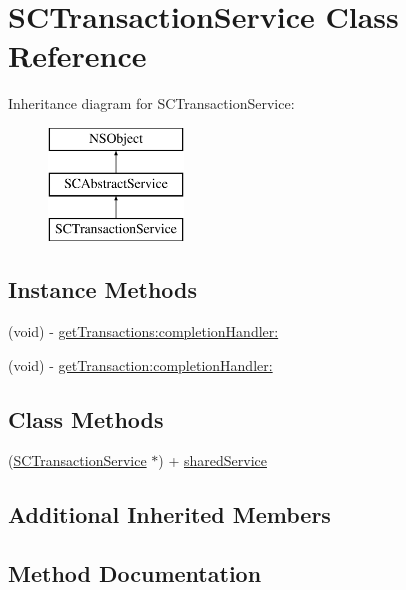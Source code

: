 \hypertarget{interface_s_c_transaction_service}{}\section{S\+C\+Transaction\+Service Class Reference}
\label{interface_s_c_transaction_service}
Inheritance diagram for S\+C\+Transaction\+Service\+:\begin{figure}[H]
\begin{center}
\leavevmode
\includegraphics[height=3.000000cm]{interface_s_c_transaction_service}
\end{center}
\end{figure}
\subsection*{Instance Methods}
\begin{DoxyCompactItemize}
\item 
(void) -\/ \hyperlink{interface_s_c_transaction_service_ac68a99e4700bfb52683f8b85da1db778}{get\+Transactions\+:completion\+Handler\+:}
\item 
(void) -\/ \hyperlink{interface_s_c_transaction_service_abe365436527afb855340ffbb63f16b3d}{get\+Transaction\+:completion\+Handler\+:}
\end{DoxyCompactItemize}
\subsection*{Class Methods}
\begin{DoxyCompactItemize}
\item 
(\hyperlink{interface_s_c_transaction_service}{S\+C\+Transaction\+Service} $\ast$) + \hyperlink{interface_s_c_transaction_service_adcafa3945695482008dcfa000512e5e1}{shared\+Service}
\end{DoxyCompactItemize}
\subsection*{Additional Inherited Members}


\subsection{Method Documentation}
